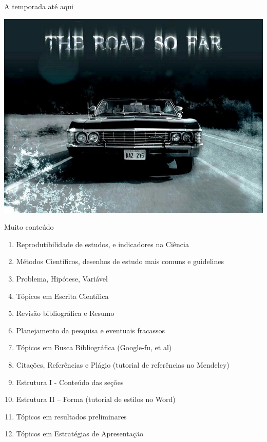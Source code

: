 \documentclass{beamer}
\begin{document}
\begin{frame}{A temporada até aqui}
  \begin{center}
    \includegraphics[width=\textwidth]{Encerramento/theroadsofar}
  \end{center}
\end{frame}

\begin{frame}{Muito conteúdo}
  \begin{enumerate}
    \scriptsize
  \item Reprodutibilidade de estudos, e indicadores na Ciência
  \item Métodos Científicos, desenhos de estudo mais comuns e guidelines
  \item Problema, Hipótese, Variável
  \item Tópicos em Escrita Científica
  \item Revisão bibliográfica e Resumo
  \item Planejamento da pesquisa e eventuais fracassos
  \item Tópicos em Busca Bibliográfica (Google-fu, et al)
  \item Citações, Referências e Plágio (tutorial de referências no Mendeley)
  \item Estrutura I - Conteúdo das seções
  \item Estrutura II – Forma (tutorial de estilos no Word)
  \item Tópicos em resultados preliminares
  \item Tópicos em Estratégias de Apresentação
  \end{enumerate}
\end{frame}
\end{document}
